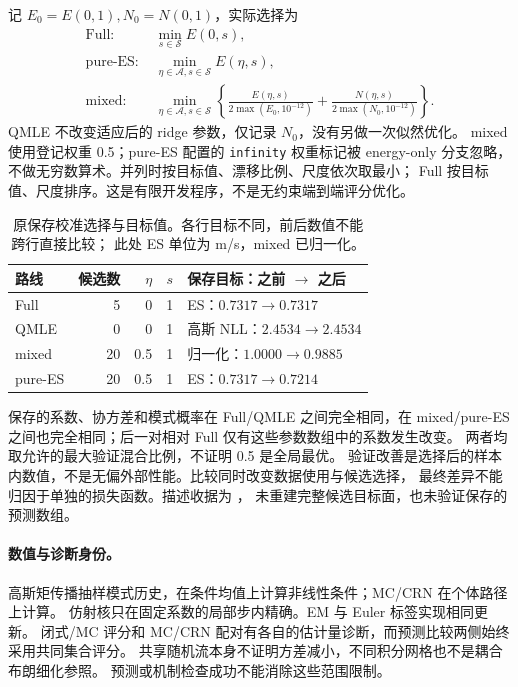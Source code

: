 \documentclass[UTF8,11pt]{ctexart}
\begin{document}
记 \(E_0=E(0,1),N_0=N(0,1)\)，实际选择为
\begin{equation}
\begin{aligned}
\text{Full: }&\min_{s\in\mathcal S} E(0,s),\\
\text{pure-ES: }&\min_{\eta\in\mathcal A,s\in\mathcal S}E(\eta,s),\\
\text{mixed: }&\min_{\eta\in\mathcal A,s\in\mathcal S}
 \left\{\frac{E(\eta,s)}{2\max(E_0,10^{-12})}
       +\frac{N(\eta,s)}{2\max(N_0,10^{-12})}\right\}.
\end{aligned}
\label{eq:estimator-objectives}
\end{equation}
QMLE 不改变适应后的 ridge 参数，仅记录 \(N_0\)，没有另做一次似然优化。
mixed 使用登记权重 0.5；pure-ES 配置的 \texttt{infinity} 权重标记被 energy-only
分支忽略，不做无穷数算术。并列时按目标值、漂移比例、尺度依次取最小；
Full 按目标值、尺度排序。这是有限开发程序，不是无约束端到端评分优化。

\begin{table}[htbp]
\centering\small
\caption{原保存校准选择与目标值。各行目标不同，前后数值不能跨行直接比较；
此处 ES 单位为 m/s，mixed 已归一化。}
\label{tab:estimator-calibration}
\begin{tabular}{lrrrl}
\toprule
路线 & 候选数 & \(\eta\) & \(s\) & 保存目标：之前 \(\to\) 之后\\
\midrule
Full & 5 & 0 & 1 & ES：\(0.7317\to0.7317\)\\
QMLE & 0 & 0 & 1 & 高斯 NLL：\(2.4534\to2.4534\)\\
mixed & 20 & 0.5 & 1 & 归一化：\(1.0000\to0.9885\)\\
pure-ES & 20 & 0.5 & 1 & ES：\(0.7317\to0.7214\)\\
\bottomrule
\end{tabular}
\end{table}

保存的系数、协方差和模式概率在 Full/QMLE 之间完全相同，在 mixed/pure-ES
之间也完全相同；后一对相对 Full 仅有这些参数数组中的系数发生改变。
两者均取允许的最大验证混合比例，不证明 0.5 是全局最优。
验证改善是选择后的样本内数值，不是无偏外部性能。比较同时改变数据使用与候选选择，
最终差异不能归因于单独的损失函数。描述收据为
，
未重建完整候选目标面，也未验证保存的预测数组。

\paragraph{数值与诊断身份。}
高斯矩传播抽样模式历史，在条件均值上计算非线性条件；MC/CRN 在个体路径上计算。
仿射核只在固定系数的局部步内精确。EM 与 Euler 标签实现相同更新。
闭式/MC 评分和 MC/CRN 配对有各自的估计量诊断，而预测比较两侧始终采用共同集合评分。
共享随机流本身不证明方差减小，不同积分网格也不是耦合布朗细化参照。
预测或机制检查成功不能消除这些范围限制。
\end{document}
